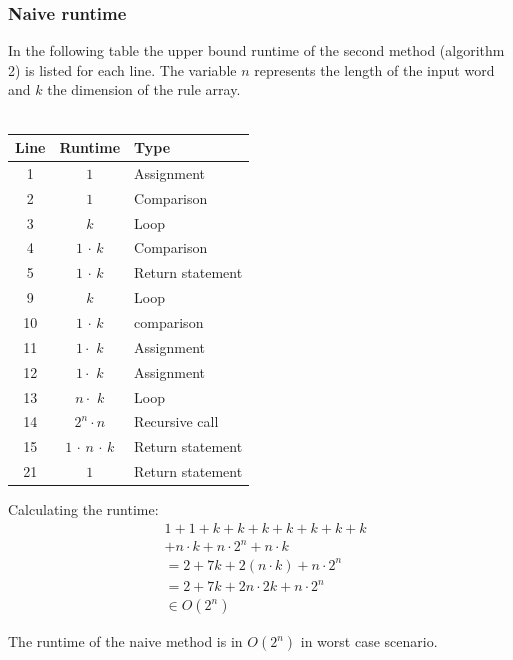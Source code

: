\documentclass[a4paper, 11pt]{article}
\begin{document}
\subsubsection{Naive runtime}
\label{naiveruntime}

In the following table the upper bound runtime of the second method (algorithm 2) is listed for each line. The variable $n$ represents the length of the input word and $k$ the dimension of the rule array.
\ \\ \ \\
\begin{minipage}{0.5\textwidth}

\begin{tabular}{|c|c|l|}
\hline
Line & Runtime & Type \\
\hline
1 &  $1$ & Assignment \\
2 &  $1$ & Comparison \\
3 & $k$  & Loop \\
4 & $1$ $\cdot$ $k$ & Comparison \\
5 & $1$ $\cdot$ $k$ & Return statement\\
9 & $k$ & Loop \\
10 & $1$ $\cdot$ $k$ & comparison \\
11 & $1 \cdot$ $k$ & Assignment \\
12 & $1 \cdot$ $k$ & Assignment\\
13 & $n \cdot$ $k$ & Loop \\
14 & $2^n \cdot n$ & Recursive call \\
15 & $1$ $\cdot$ $n$ $\cdot$ $k$ & Return statement\\
21 & $1$ & Return statement \\
\hline
\end{tabular}


\end{minipage}\begin{minipage}{0.5\textwidth}
Calculating the runtime:
\vspace*{-1em}
\begin{align*}
& 1 + 1+ k + k +k + k + k + k + k \\
& + n \cdot k + n \cdot 2^n + n \cdot k \\
& =  2 + 7k + 2(n \cdot k) + n \cdot 2^n \\
& = 2 + 7k + 2n \cdot 2k + n \cdot 2^n \\
& \in O(2^n)
\end{align*}

The runtime of the naive method is in $O(2^n)$ in worst case scenario.


\end{minipage}
\end{document}
